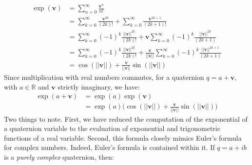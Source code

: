 \documentclass{article}
\begin{document}
            \begin{subequations}
                \begin{align}
                    \exp(\mathbf{v})
                    &=\sum_{n=0}^{\infty}\frac{\mathbf{v}^{n}}{n!}\\
                    &=\sum_{k=0}^{\infty}\frac{\mathbf{v}^{2k}}{(2k)!}
                        +\sum_{k=0}^{\infty}\frac{\mathbf{v}^{2k+1}}{(2k+1)!}\\
                    &=\sum_{k=0}^{\infty}
                        (-1)^{k}\frac{||\mathbf{v}||^{2k}}{(2k)!}
                        +\mathbf{v}
                        \sum_{k=0}^{\infty}(-1)^{k}
                            \frac{||\mathbf{v}||^{2k}}{(2k+1)}\\
                    &=\sum_{k=0}^{\infty}
                        (-1)^{k}\frac{||\mathbf{v}||^{2k}}{(2k)!}
                        +\frac{\mathbf{v}}{||\mathbf{v}||}
                        \sum_{k=0}^{\infty}(-1)^{k}
                            \frac{||\mathbf{v}||^{2k+1}}{(2k+1)}\\
                    &=\cos(||\mathbf{v}||)+
                        \frac{\mathbf{v}}{||\mathbf{v}||}\sin(||\mathbf{v}||)
                \end{align}
            \end{subequations}
            Since multiplication with real numbers commutes, for a
            quaternion $q=a+\mathbf{v}$, with $a\in\mathbb{R}$ and
            $\mathbf{v}$ strictly imaginary, we have:
            \begin{subequations}
                \label{eqn:exp_quaternion_formula}
                \begin{align}
                    \exp(a+\mathbf{v})
                    &=\exp(a)\exp(\mathbf{v})\\
                    &=\exp(a)\Big(
                        \cos(||\mathbf{v}||)+
                        \frac{\mathbf{v}}{||\mathbf{v}||}
                        \sin(||\mathbf{v}||)
                    \Big)
                \end{align}
            \end{subequations}
            Two things to note. First, we have reduced the computation of the
            exponential of a quaternion variable to the evaluation of
            exponential and trigonometric functions of a real variable.
            Second, this formula closely mimics Euler's formula for complex
            numbers. Indeed, Euler's formula is contained within it. If
            $q=a+ib$ is a \textit{purely complex} quaternion, then:
\end{document}
